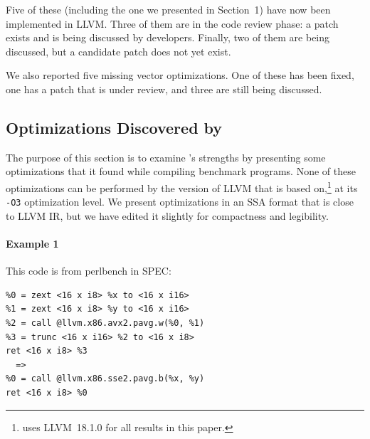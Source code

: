 %
Five of these (including the one we presented in Section~1) have now
been implemented in LLVM\@.
%
Three of them are in the code review phase: a patch exists and is
being discussed by developers.
%
Finally, two of them are being discussed, but a candidate patch does
not yet exist.


We also reported five missing vector optimizations.
%
One of these has been fixed, one has a patch that is under review, and
three are still being discussed.


\subsection{Optimizations Discovered by \minotaur}
\label{sec:examples}

The purpose of this section is to examine \minotaur's strengths by
presenting some optimizations that it found while compiling benchmark
programs.
%
None of these optimizations can be performed by the version of LLVM
that \minotaur{} is based on,\footnote{\minotaur{} uses LLVM~18.1.0 for all
results in this paper.}  at its \texttt{-O3} optimization level.
%
We present optimizations in an SSA format that is close to LLVM IR,
but we have edited it slightly for compactness and legibility.

\paragraph*{Example 1}

This code is from perlbench in SPEC:

{\begin{quoting}\begin{Verbatim}
%0 = zext <16 x i8> %x to <16 x i16>
%1 = zext <16 x i8> %y to <16 x i16>
%2 = call @llvm.x86.avx2.pavg.w(%0, %1)
%3 = trunc <16 x i16> %2 to <16 x i8>
ret <16 x i8> %3
  =>
%0 = call @llvm.x86.sse2.pavg.b(%x, %y)
ret <16 x i8> %0
\end{Verbatim}
\end{quoting}}

